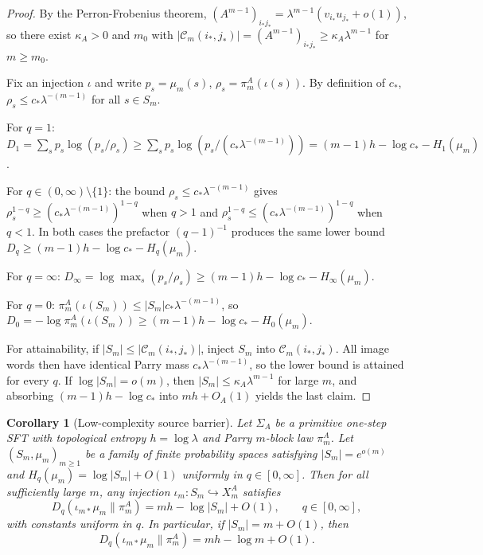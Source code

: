 \documentclass[11pt,letterpaper]{article}
\numberwithin{equation}{section}
\theoremstyle{plain}
\newtheorem{corollary}[theorem]{Corollary}
\theoremstyle{definition}
\theoremstyle{remark}
\begin{document}
\begin{proof}
By the Perron-Frobenius theorem,
\((A^{m-1})_{i_*j_*}=\lambda^{m-1}(v_{i_*}u_{j_*}+o(1))\), so there exist
\(\kappa_A>0\) and \(m_0\) with
\(|\mathcal C_m(i_*,j_*)|=(A^{m-1})_{i_*j_*}\ge \kappa_A\lambda^{m-1}\) for
\(m\ge m_0\).

Fix an injection \(\iota\) and write \(p_s=\mu_m(s)\),
\(\rho_s=\pi_m^A(\iota(s))\). By definition of \(c_*\),
\(\rho_s\le c_*\lambda^{-(m-1)}\) for all \(s\in S_m\).

For \(q=1\):
\(D_1=\sum_s p_s\log(p_s/\rho_s)
\ge \sum_s p_s\log(p_s/(c_*\lambda^{-(m-1)}))
=(m-1)h-\log c_*-H_1(\mu_m)\).

For \(q\in(0,\infty)\setminus\{1\}\): the bound
\(\rho_s\le c_*\lambda^{-(m-1)}\) gives
\(\rho_s^{1-q}\ge (c_*\lambda^{-(m-1)})^{1-q}\) when \(q>1\) and
\(\rho_s^{1-q}\le (c_*\lambda^{-(m-1)})^{1-q}\) when \(q<1\). In both cases
the prefactor \((q-1)^{-1}\) produces the same lower bound
\(D_q\ge (m-1)h-\log c_*-H_q(\mu_m)\).

For \(q=\infty\):
\(D_\infty=\log\max_s(p_s/\rho_s)\ge (m-1)h-\log c_*-H_\infty(\mu_m)\).

For \(q=0\):
\(\pi_m^A(\iota(S_m))\le |S_m|c_*\lambda^{-(m-1)}\), so
\(D_0=-\log\pi_m^A(\iota(S_m))\ge (m-1)h-\log c_*-H_0(\mu_m)\).

For attainability, if \(|S_m|\le |\mathcal C_m(i_*,j_*)|\), inject
\(S_m\) into \(\mathcal C_m(i_*,j_*)\). All image words then have identical
Parry mass \(c_*\lambda^{-(m-1)}\), so the lower bound is attained for
every \(q\). If \(\log|S_m|=o(m)\), then
\(|S_m|\le \kappa_A\lambda^{m-1}\) for large \(m\), and absorbing
\((m-1)h-\log c_*\) into \(mh+O_A(1)\) yields the last claim.
\end{proof}

\begin{corollary}[Low-complexity source barrier]
\label{cor:low-complexity-source-barrier}
Let \(\Sigma_A\) be a primitive one-step SFT with topological entropy
\(h=\log\lambda\) and Parry \(m\)-block law \(\pi_m^A\). Let
\((S_m,\mu_m)_{m\ge 1}\) be a family of finite probability spaces satisfying
\(|S_m|=e^{o(m)}\) and \(H_q(\mu_m)=\log|S_m|+O(1)\) uniformly in
\(q\in[0,\infty]\). Then for all sufficiently large \(m\), any injection
\(\iota_m:S_m\hookrightarrow X_m^A\) satisfies
\[
D_q(\iota_{m*}\mu_m\|\pi_m^A)
=
mh-\log|S_m|+O(1),
\qquad q\in[0,\infty],
\]
with constants uniform in \(q\). In particular, if \(|S_m|=m+O(1)\), then
\[
D_q(\iota_{m*}\mu_m\|\pi_m^A)
=
mh-\log m+O(1).
\]
\end{corollary}
\end{document}
